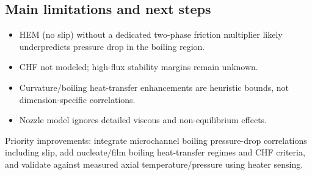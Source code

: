 \documentclass[11pt,a4paper]{article}
\begin{document}
\subsection*{Main limitations and next steps}
\begin{itemize}[nosep]
  \item HEM (no slip) without a dedicated two-phase friction multiplier likely underpredicts pressure drop in the boiling region.
  \item CHF not modeled; high-flux stability margins remain unknown.
  \item Curvature/boiling heat-transfer enhancements are heuristic bounds, not dimension-specific correlations.
  \item Nozzle model ignores detailed viscous and non-equilibrium effects.
\end{itemize}
Priority improvements: integrate microchannel boiling pressure-drop correlations including slip, add nucleate/film boiling heat-transfer regimes and CHF criteria, and validate against measured axial temperature/pressure using heater sensing.





\end{document}
